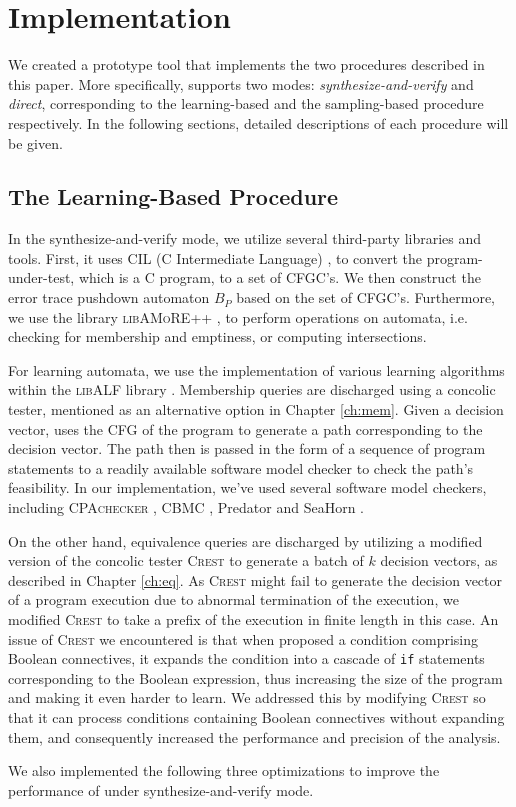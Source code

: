 \chapter{Implementation}\label{ch:implementation}

We created a prototype tool \PACMAN that implements the two procedures described in this paper. More specifically, \PACMAN supports two modes: \emph{synthesize-and-verify} and \emph{direct}, corresponding to the learning-based and the sampling-based procedure respectively. In the following sections, detailed descriptions of each procedure will be given.

\section{The Learning-Based Procedure}\label{sec:impl_learning}

In the synthesize-and-verify mode, we utilize several third-party libraries and tools. First, it uses CIL (C Intermediate Language) \cite{NeculaMRW02}, \cite{cil} to convert the program-under-test, which is a C program, to a set of CFGC's. We then construct the error trace pushdown automaton $B_P$ based on the set of CFGC's. Furthermore, we use the library \textsc{libAMoRE++} \cite{MatzMPTV95}, \cite{BolligKKLNP10} to perform operations on automata, i.e. checking for membership and emptiness, or computing intersections. 

For learning automata, we use the implementation of various learning algorithms within the \textsc{libALF} library \cite{BolligKKLNP10}. Membership queries are discharged using a concolic tester, mentioned as an alternative option in Chapter \ref{ch:mem}. Given a decision vector, \PACMAN uses the CFG of the program to generate a path corresponding to the decision vector. The path then is passed in the form of a sequence of program statements to a readily available software model checker to check the path's feasibility. In our implementation, we've used several software model checkers, including \textsc{CPAchecker} \cite{BeyerK11}, CBMC \cite{ClarkeKL04}, Predator \cite{DudkaPV11} and SeaHorn \cite{GurfinkelKKN15}.

On the other hand, equivalence queries are discharged by utilizing a modified version of the concolic tester \textsc{Crest} \cite{BurnimS08} to generate a batch of $k$ decision vectors, as described in Chapter \ref{ch:eq}. As \textsc{Crest} might fail to generate the decision vector of a program execution due to abnormal termination of the execution, we modified \textsc{Crest} to take a prefix of the execution in finite length in this case. An issue of \textsc{Crest} we encountered is that when proposed a condition comprising Boolean connectives, it expands the condition into a cascade of \texttt{if} statements corresponding to the Boolean expression, thus increasing the size of the program and making it even harder to learn. We addressed this by modifying \textsc{Crest} so that it can process conditions containing Boolean connectives without expanding them, and consequently increased the performance and precision of the analysis. 

We also implemented the following three optimizations to improve the performance of \PACMAN under synthesize-and-verify mode.